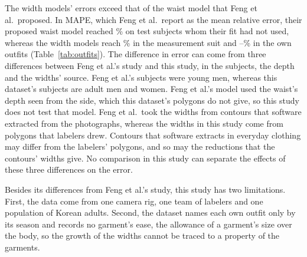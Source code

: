 \documentclass[12pt]{article}
\begin{document}
The width models' errors exceed that of the waist model that Feng et al.\ proposed. In MAPE, which Feng et al.\ report as the mean relative error, their proposed waist model reached
\fengWaistMape\% on test subjects whom their fit had not used,\cite{feng2026} whereas the width models reach
\mapeWidthSuit\% in the measurement suit and \mapeWidthOwnMin--\mapeWidthOwnMax\% in the own outfits
(Table~\ref{tab:outfits}). The difference in error can come from three differences between Feng et al.'s study and this study, in the subjects,
the depth and the widths' source. Feng et al.'s subjects were young men, whereas this dataset's subjects are adult men and
women. Feng et al.'s model used the waist's depth seen from the side, which this dataset's polygons do not give, so
this study does not test that model. Feng et al.\ took the widths from contours that software extracted from the
photographs, whereas the widths in this study come from polygons that labelers
drew. Contours that software extracts in everyday clothing may differ from the labelers' polygons, and so may the reductions that the contours' widths give. No comparison in this study can separate the effects of these three differences on the error.

Besides its differences from Feng et al.'s study, this study has two limitations. First, the data come from one camera
rig, one team of labelers and one population of Korean adults. Second, the dataset names each own outfit only by its
season and records no garment's ease, the allowance of a garment's size over the body, so the growth of the widths
cannot be traced to a property of the garments.

\begin{table}[t]
\centering
\caption{Waist girth prediction by outfit under the primary scale rule, for the \nSubjects\ subjects who have the
widths in all six outfits. Width model: the MAPE of the model on the baseline model's inputs plus the outfit's frontal
and diagonal widths. Reduction: the baseline model's MAPE minus the width model's MAPE, with its \ciLevel\% bootstrap
confidence interval over subjects, and the same difference in RMSE with its interval. Shortfall: the measurement suit's reduction minus
the outfit's reduction. Width growth: the median over subjects
of the outfit's width minus the suit's width. MAPE in \%, reductions and shortfalls in percentage points or in cm as headed, widths in cm. Differences are
computed before rounding.}
\label{tab:outfits}
\scriptsize
\setlength{\tabcolsep}{4pt}

\end{table}
\end{document}
